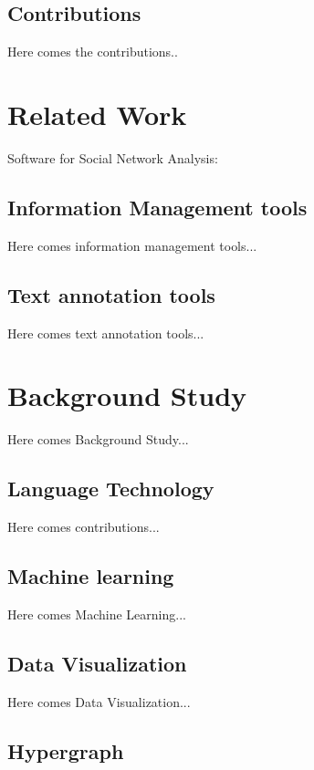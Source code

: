 \documentclass[
    fontsize=12pt,
    headings=small,
    parskip=half,           %
    bibliography=totoc,
    numbers=noenddot,       %
    open=any,               %
    ]{scrreprt}
\begin{document}
\section{Contributions}

Here comes the contributions..


\chapter{Related Work}

Software for Social Network Analysis: \cite{M_Huisman}


\section{Information Management tools}

Here comes information management tools...


\section{Text annotation tools}

Here comes text annotation tools...



\chapter{Background Study}

Here comes Background Study...


\section{Language Technology}

Here comes contributions...


\section{Machine learning}

Here comes Machine Learning...


\section{Data Visualization}

Here comes Data Visualization...

\section{Hypergraph}
\end{document}
